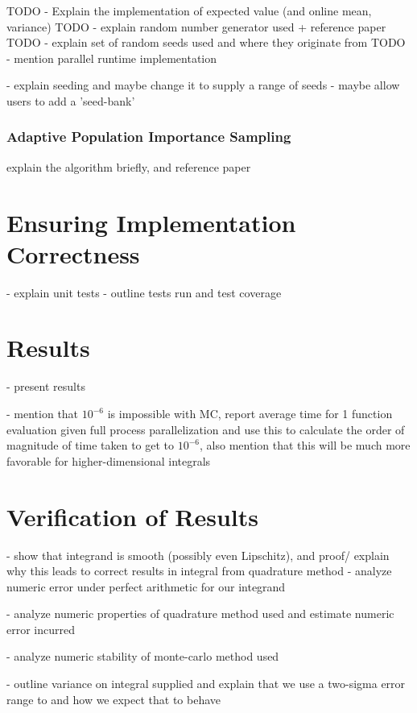 \documentclass[10pt, a4paper]{article}
\begin{document}
  TODO - Explain the implementation of expected value (and online mean, variance)
  TODO - explain random number generator used + reference paper
  TODO - explain set of random seeds used and where they originate from
  TODO - mention parallel runtime implementation

- explain seeding and maybe change it to supply a range of seeds
  - maybe allow users to add a 'seed-bank'

  \subsubsection{Adaptive Population Importance Sampling}
  explain the \apis{} algorithm briefly, and reference paper

\section{Ensuring Implementation Correctness}

- explain unit tests
- outline tests run and test coverage

\section{Results}

- present results

- mention that $10^{-6}$ is impossible with MC, report average time for 1 function evaluation given
  full process parallelization and use this to calculate the order of magnitude of time taken to
  get to $10^{-6}$, also mention that this will be much more favorable for higher-dimensional integrals

\section{Verification of Results}

- show that integrand is smooth (possibly even Lipschitz), and proof/ explain why this leads to
  correct results in integral from quadrature method
  - analyze numeric error under perfect arithmetic for our integrand

- analyze numeric properties of quadrature method used and estimate numeric error incurred

- analyze numeric stability of monte-carlo method used

- outline variance on integral supplied and explain that we use a two-sigma error range to
  and how we expect that to behave
\end{document}
